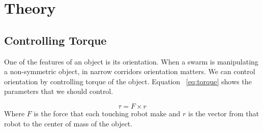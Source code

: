 \section{Theory}
\label{sec:theory}
\subsection{Controlling Torque}

One of the features of an object is its orientation. When a swarm is manipulating a non-symmetric object, in narrow corridors orientation matters. We can control orientation by controlling torque of the object. Equation ~\ref{eq:torque} shows the parameters that we should control.

\begin{equation}
\tau = F \times r\label{eq:torque}
\end{equation}
Where $F$ is the force that each touching robot make and $r$ is the vector from that robot to the center of mass of the object. 





